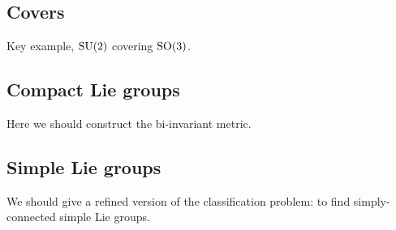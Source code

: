 \subsection{Covers}

Key example, $\mathrm{SU}(2)$ covering $\mathrm{SO}(3)$.


\subsection{Compact Lie groups}

Here we should construct the bi-invariant metric.


\subsection{Simple Lie groups}
We should give a refined version of the classification problem: to find simply-connected simple Lie groups.
